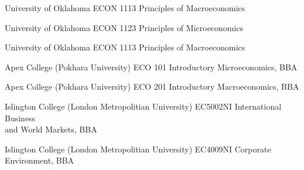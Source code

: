 {%
	University of Oklahoma}
{%
	ECON 1113 Principles of Macroeconomics}
{}

{%
	University of Oklahoma}
{%
	ECON 1123 Principles of Microeconomics}
{}

{%
	University of Oklahoma}
{%
	ECON 1113 Principles of Macroeconomics}
{}

{%
	Apex College (Pokhara University)}
{%
	ECO 101 Introductory Microeconomics, BBA}
{}

{%
	Apex College (Pokhara University)}
{%
	ECO 201 Introductory Macroeconomics, BBA}
{}

{%
	Islington College (London Metropolitian University)}
{%
	EC5002NI International Business \\ and World Markets, BBA}
{}

{%
	Islington College (London Metropolitian University)}
{%
	EC4009NI Corporate Environment, BBA}
{}



